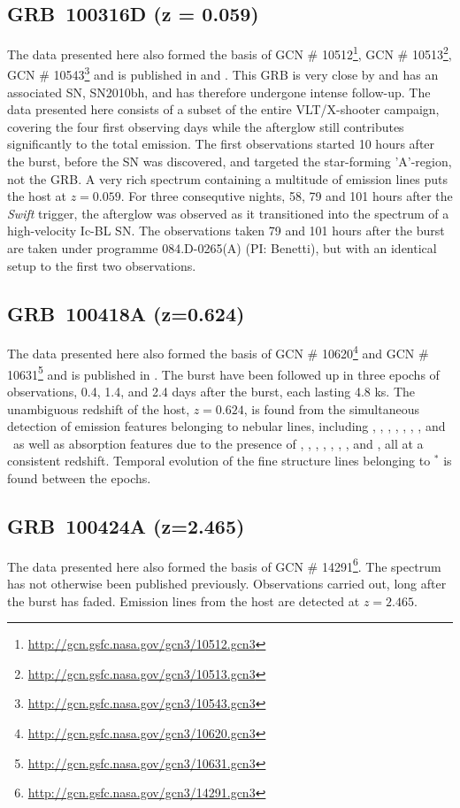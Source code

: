 \documentclass{aa}    %
\begin{document}
\subsection{GRB~100316D (z = 0.059)}
The data presented here also formed the basis of GCN \#
10512\footnote{\url{http://gcn.gsfc.nasa.gov/gcn3/10512.gcn3}}, GCN \#
10513\footnote{\url{http://gcn.gsfc.nasa.gov/gcn3/10513.gcn3}}, GCN \#
10543\footnote{\url{http://gcn.gsfc.nasa.gov/gcn3/10543.gcn3}} and is published
in \citet{Bufano2012} and \citet{Starling2011}. This GRB is very close by and
has an associated SN, SN2010bh, and has therefore undergone intense follow-up. The data
presented here consists of a subset of the entire VLT/X-shooter campaign,
covering the four first observing days while the afterglow still contributes
significantly to the total emission. The first observations started 10 hours
after the burst, before the SN was discovered, and targeted the star-forming
'A'-region\citep{Starling2011}, not the GRB. A very rich spectrum containing a
multitude of emission lines puts the host at $z = 0.059$. For three consequtive
nights, 58, 79 and 101 hours after the \textit{Swift} trigger, the afterglow
was observed as it transitioned into the spectrum of a high-velocity Ic-BL SN.
The observations taken 79 and 101 hours after the burst are taken under
programme 084.D-0265(A) (PI: Benetti), but with an identical setup to the first
two observations.

\subsection{GRB~100418A (z=0.624)}
The data presented here also formed the basis of GCN \#
10620\footnote{\url{http://gcn.gsfc.nasa.gov/gcn3/10620.gcn3}} and GCN \#
10631\footnote{\url{http://gcn.gsfc.nasa.gov/gcn3/10631.gcn3}} and is published
in \citet{DeUgartePostigo2011}. The burst have been followed up in three epochs
of observations, 0.4, 1.4, and 2.4 days after the burst, each lasting 4.8 ks.
The unambiguous redshift of the host, $z=0.624$, is found from the simultaneous
detection of emission features belonging to nebular lines, including \hi, \oii,
\oiii, \neiii, \nii, \sii, \siii, and \hei~as well as absorption features due
to the presence of \znii, \crii, \feii, \mnii, \mgii, \mgi, \tiii, and \caii,
all at a consistent redshift. Temporal evolution of the fine structure lines
belonging to \feii$^*$ is found between the epochs.

\subsection{GRB~100424A (z=2.465)}
The data presented here also formed the basis of GCN \#
14291\footnote{\url{http://gcn.gsfc.nasa.gov/gcn3/14291.gcn3}}. The spectrum
has not otherwise been published previously. Observations carried out, long
after the burst has faded.  Emission lines from the host are detected at
$z=2.465$.
\end{document}
